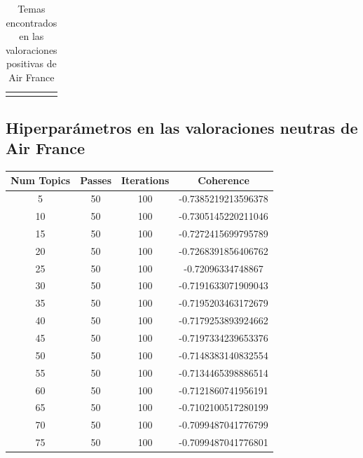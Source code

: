\documentclass{report}
\begin{document}
{\begin{longtable}{|p{1cm}|p{4cm}|p{4cm}|p{6cm}|}
                    \hline
                    \caption{Temas encontrados en las valoraciones positivas de Air France}
                \end{longtable}
            \clearpage\subsection{Hiperparámetros en las valoraciones neutras de Air France}
                \label{tab:hiperparametros_air_france_neutras}
                \begin{longtable}{|c|c|c|c|}
                    \hline
                    \textbf{Num Topics} & \textbf{Passes} & \textbf{Iterations} & \textbf{Coherence} \\
                    \hline
                    5 & 50 & 100 & -0.7385219213596378 \\
                    \hline
                    10 & 50 & 100 & -0.7305145220211046 \\
                    \hline
                    15 & 50 & 100 & -0.7272415699795789 \\
                    \hline
                    20 & 50 & 100 & -0.7268391856406762 \\
                    \hline
                    25 & 50 & 100 & -0.72096334748867 \\
                    \hline
                    30 & 50 & 100 & -0.7191633071909043 \\
                    \hline
                    35 & 50 & 100 & -0.7195203463172679 \\
                    \hline
                    40 & 50 & 100 & -0.7179253893924662 \\
                    \hline
                    45 & 50 & 100 & -0.7197334239653376 \\
                    \hline
                    50 & 50 & 100 & -0.7148383140832554 \\
                    \hline
                    55 & 50 & 100 & -0.7134465398886514 \\
                    \hline
                    60 & 50 & 100 & -0.7121860741956191 \\
                    \hline
                    65 & 50 & 100 & -0.7102100517280199 \\
                    \hline
                    70 & 50 & 100 & -0.7099487041776799 \\
                    \hline
                    75 & 50 & 100 & -0.7099487041776801 \\

\end{longtable}}
\end{document}
